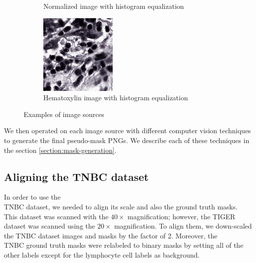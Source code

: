 \begin{figure}[H]
\begin{subfigure}[b]{0.32\textwidth}
    \caption{Normalized image with histogram equalization}\label{fig:tiger-norm-eq}
  \end{subfigure}\hfill
  \begin{subfigure}[b]{0.32\textwidth}
    \centering
    \includegraphics[width=\linewidth]{assets/images/for_presentation/hem_eq_TCGA-EW-A1P8-01Z-00-DX1.E9852193-8CDD-49EF-B49B-DA6931198F0D_[8391, 13690, 8532, 13838].png}
    \caption{Hematoxylin image with histogram equalization}\label{fig:tiger-hem-eq}
  \end{subfigure}
  \caption{Examples of image sources}
  \label{fig:tiger-sources}
\end{figure}


We then operated on each image source with different computer vision techniques to generate the final pseudo-mask PNGs. We describe each of these techniques in the section \ref{section:mask-generation}. 

\subsection{Aligning the TNBC dataset} 
In order to use the \\ 
TNBC dataset, we needed to align its scale and also the ground truth masks. This dataset was scanned with the $40\times$ magnification; however, the TIGER dataset was scanned using the $20\times$ magnification. To align them, we down-scaled the TNBC dataset images and masks by the factor of 2. Moreover, the 
\\ TNBC ground truth masks were relabeled to binary masks by setting all of the other labels except for the lymphocyte cell labels as background.

